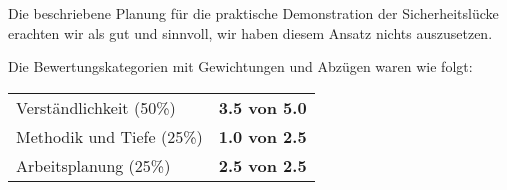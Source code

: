 \documentclass{article}
\begin{document}
  Die beschriebene Planung für die praktische Demonstration der Sicherheitslücke
  erachten wir als gut und sinnvoll, wir haben diesem Ansatz nichts auszusetzen.

  \pagebreak

  Die Bewertungskategorien mit Gewichtungen und Abzügen waren wie folgt:

  \begin{tabular}{ll}
    Verständlichkeit (50\%) & \textbf{3.5 von 5.0} \\
    Methodik und Tiefe (25\%) & \textbf{1.0 von 2.5} \\
    Arbeitsplanung (25\%) & \textbf{2.5 von 2.5} \\
  \end{tabular}

	
	
\end{document}
